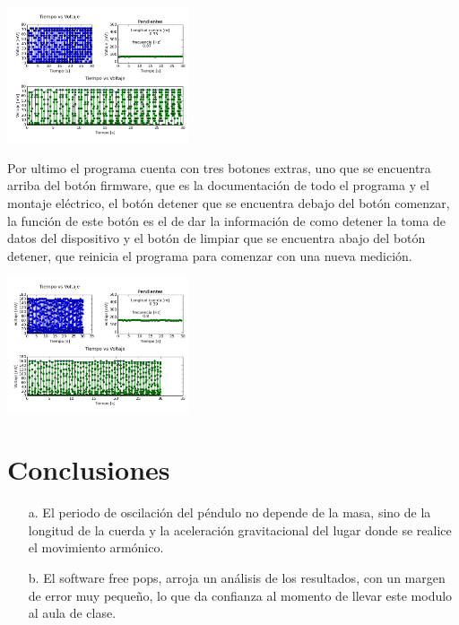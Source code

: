 \documentclass[12pt]{article}
\newenvironment{Figure}
{\par\medskip\noindent\minipage{\linewidth}}
{\endminipage\par\medskip}
\begin{document}
\begin{multicols}{2}
\begin{Figure}
\center
\includegraphics[width=9.cm, height=4cm]{fig/Graficas.png}
\label{fig:g16}
\end{Figure}

Por ultimo el programa cuenta con tres botones extras, uno que se encuentra arriba del botón firmware, que es la documentación de todo el programa y el montaje eléctrico, el botón detener que se encuentra debajo del botón comenzar, la función de este botón es el de dar la información de como detener la toma de datos del dispositivo  y el botón de limpiar que se encuentra abajo del botón detener, que reinicia el programa para comenzar con una nueva medición.


\begin{Figure}
\center
\includegraphics[width=9.cm, height=4cm]{fig/Graficas1.png}
\label{fig:g17}
\end{Figure}

\section{Conclusiones}
\begin{enumerate}
\item[a. ] El periodo de oscilación del péndulo no depende de la masa, sino de la longitud de la cuerda y la aceleración gravitacional del lugar donde se realice el movimiento armónico. 

\item[b. ] El software free pops, arroja un análisis de los resultados, con un margen de error muy pequeño, lo que da confianza al momento de llevar este modulo al aula de clase.


\end{enumerate}
\end{multicols}
\end{document}
